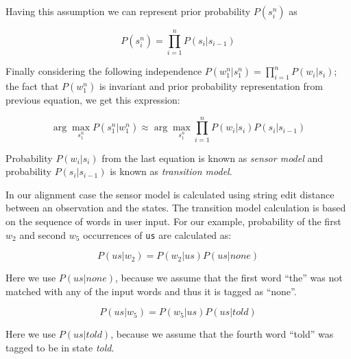 \begin{center}
Having this assumption we can represent prior probability $P(s_{i}^{n})$ as
\end{center}
\begin{large}
\begin{equation}
P(s_{i}^{n}) = \prod^{n}_{i=1} P(s_{i}|s_{i-1})
\end{equation}
\end{large}

\begin{center}
Finally considering the following independence $P(w_{1}^{n}|s_{1}^{n}) = \prod_{i=1}^{n}P(w_{i}|s_{i})$; the fact that $P(w_{1}^{n})$ is invariant and prior probability representation from previous equation, we get this expression:
\end{center}
\begin{large}
\begin{equation}
\arg \max_{s_{1}^{n}} P(s_{1}^{n}|w_{1}^{n}) \approx  \arg \max_{s_{1}^{n}} \prod^{n}_{i=1} P(w_{i}|s_{i}) P(s_{i}|s_{i-1})
\end{equation}
\end{large}
\begin{center}
Probability $P(w_{i}|s_{i})$ from the last equation is known as \emph{sensor model} and probability $P(s_{i}|s_{i-1})$ is known as \emph{transition model}.
\end{center}

In our alignment case the sensor model is calculated using string edit distance between an observation and the states. The transition model calculation is based on the sequence of words in user input. For our example, probability of the first $w_{2}$ and second $w_{5}$ occurrences of \texttt{us} are calculated as: 

\begin{large}
\begin{equation}
P(us|w_{2}) = P(w_{2}|us) P(us|none)
\end{equation}
\end{large}
\begin{center}
Here we use $P(us|none)$, because we assume that the first word ``the'' was not matched with any of the input words and thus it is tagged as ``none''.
\end{center}

\begin{large}
\begin{equation}
P(us|w_{5}) = P(w_{5}|us) P(us|told)
\end{equation}
\end{large}
\begin{center}
Here we use $P(us|told)$, because we assume that the fourth word ``told'' was tagged to be in state \emph{told}.
\end{center}

